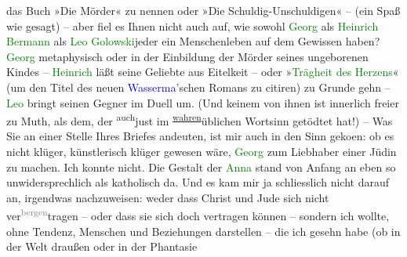                     das Buch »Die Mörder« zu nennen oder »Die Schuldig-Unschuldigen« – (ein Spaß wie
                    gesagt) – aber fiel es Ihnen nicht auch auf, wie sowohl \textcolor{green}{Georg}{} als \textcolor{green}{Heinrich Bermann}{} als \textcolor{green}{Leo Golowski}{}\introOben{}jeder\introOben{} ein Menschenleben auf dem Gewissen haben? \textcolor{green}{Georg}{} metaphysisch oder in
                    der Einbildung der Mörder seines ungeborenen Kindes – \textcolor{green}{Heinrich}{} läßt seine Geliebte aus
                    Eitelkeit – oder »\textcolor{green}{Trägheit des Herzens}{}\ledrightnote{\textcolor{green}{Caspar Hauser oder Die Trägheit des Herzens}}« (um
                    den Titel des neuen \textcolor{blue}{Wasserma{\geminationn}}{}\ledrightnote{\textcolor{blue}{Jakob Wassermann}}’schen Romans zu citiren) zu {\pb}Grunde gehn – \textcolor{green}{Leo}{} bringt seinen Gegner im Duell um.
                    (Und keinem von ihnen ist innerlich freier zu Muth, als dem, der \substVorne{}\textsuperscript{auch}\substDazwischen{}just\substHinten{} im \substVorne{}\textsuperscript{\uline{wahren}}{\allowbreak}\substDazwischen{}üblichen\substHinten{} Wortsinn getödtet hat!)\pend
           \pstart
           – Was Sie an einer Stelle Ihres Briefes andeuten, ist mir auch in den Sinn geko{\geminationm}en: ob es nicht klüger, künstlerisch klüger
                    gewesen wäre, \textcolor{green}{Georg}{} zum
                    Liebhaber einer Jüdin zu machen. Ich konnte nicht. Die Gestalt der \textcolor{green}{Anna}{}
               stand von Anfang an
                    eben so unwidersprechlich als katholisch da. Und es kam mir ja schliesslich
                    nicht darauf an, irgendwas nachzuweisen: weder dass Christ und Jude sich nicht ver\substVorne{}\textsuperscript{\textcolor{gray}{bergen}}{\allowbreak}\substDazwischen{}tragen\substHinten{} – oder dass sie sich doch vertragen können – sondern ich wollte, ohne
                    Tendenz, {\pb}Menschen und Beziehungen
                    darstellen – die ich gesehn habe (ob in der Welt draußen oder in der Phantasie
